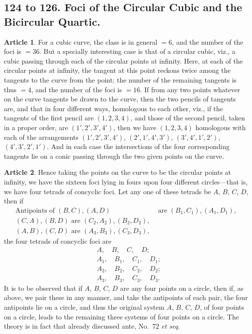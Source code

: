 \documentclass[11pt,a4paper]{article}
\theoremstyle{definition}
\newtheorem{art}{Article}
\begin{document}
\subsection{124 to 126. Foci of the Circular Cubic and the Bicircular Quartic.}

\begin{art}
For a cubic curve, the class is in general $= 6$, and the number of the foci is $= 36$. But a specially interesting case is that of a circular cubic, viz., a cubic passing through each of the circular points at infinity. Here, at each of the circular points at infinity, the tangent at this point reckons twice among the tangents to the curve from the point; the number of the remaining tangents is thus $= 4$, and the number of the foci is $= 16$. If from any two points whatever on the curve tangents be drawn to the curve, then the two pencils of tangents are, and that in four different ways, homologous to each other, viz., if the tangents of the first pencil are $(1, 2, 3, 4)$, and those of the second pencil, taken in a proper order, are $(1', 2', 3', 4')$, then we have $(1, 2, 3, 4)$ homologous with each of the arrangements $(1', 2', 3', 4')$, $(2', 1', 4', 3')$, $(3', 4', 1', 2')$, $(4', 3', 2', 1')$. And in each case the intersections of the four corresponding tangents lie on a conic passing through the two given points on the curve.
\end{art}

\begin{art}
Hence taking the points on the curve to be the circular points at infinity, we have the sixteen foci lying in fours upon four different circles---that is, we have four tetrads of concyclic foci. Let any one of these tetrads be $A$, $B$, $C$, $D$, then if
\begin{align*}
\text{Antipoints of } (B, C), (A, D) &\text{ are } (B_{1}, C_{1}), (A_{1}, D_{1}), \\
(C, A), (B, D) \text{ are } (C_{2}, A_{2}), (B_{2}, D_{2}), \\
(A, B), (C, D) \text{ are } (A_{3}, B_{3}), (C_{3}, D_{3}),
\end{align*}
the four tetrads of concyclic foci are
\begin{align*}
& A, \quad B, \quad C, \quad D; \\
& A_{1}, \quad B_{1}, \quad C_{1}, \quad D_{1}; \\
& A_{2}, \quad B_{2}, \quad C_{2}, \quad D_{2}; \\
& A_{3}, \quad B_{3}, \quad C_{3}, \quad D_{3}.
\end{align*}
It is to be observed that if $A$, $B$, $C$, $D$ are any four points on a circle, then if, as above, we pair these in any manner, and take the antipoints of each pair, the four antipoints lie on a circle, and thus the original system $A$, $B$, $C$, $D$, of four points on a circle, leads to the remaining three systems of four points on a circle. The theory is in fact that already discussed ante, No.\ 72 \textit{et seq.}
\end{art}
\end{document}
